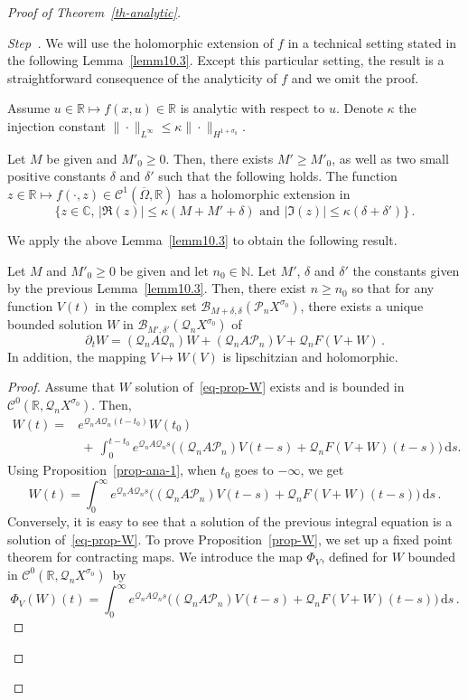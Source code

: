 \documentclass[AHL,Unicode,longabstracts]{cedram}
\newcommand{\RR}{\mathbb{R}}
\newcommand{\NN}{\mathbb{N}}
\newcommand{\CC}{\mathbb{C}}
\newcommand{\Cc}{\mathcal{C}}
\newcommand{\Bc}{\mathcal{B}}
\newcommand{\Pc}{\mathcal{P}}
\newcommand{\Qc}{\mathcal{Q}}
\newcommand{\drm}{\mathrm{d}}
\newcounter{stepcount}
\newenvironment{step}{\refstepcounter{stepcount}\begin{proof}[Step~\thestepcount]}{\let\qed\relax\end{proof}}
\begin{document}
\begin{proof}[{Proof of Theorem~\ref{th-analytic}}]
\begin{step}
We will use the holomorphic extension of $f$ in a technical setting stated in the following Lemma~\ref{lemm10.3}. Except this particular setting, the result is a straightforward consequence of the analyticity of $f$ and we omit the proof.
\begin{lemm}\label{lemm10.3}
Assume $u\in\RR \mapsto f(x,u)\in\RR$ is analytic with respect to $u$. Denote $\kappa$ the injection constant $\|\cdot\|_{L^\infty}\leq \kappa
\|\cdot\|_{H^{1+\sigma_0}}$.

Let $M$ be given and $M'_0\geq 0$. Then, there exists $M'\geq M'_0$, as well as two small positive constants $\delta$ and $\delta'$ such that the following holds. The function $z\in\RR \mapsto f(\cdot,z)\in \Cc^1(\overline\Omega,\RR)$ has a holomorphic extension in 
\[
\big\{z\in\CC,\,|\Re(z)|\leq \kappa(M+M'+\delta)\text{ and }|\Im(z)|\leq \kappa(\delta+\delta')\big\}\,.
\]
\end{lemm}

We apply the above Lemma~\ref{lemm10.3} to obtain the following result.

\begin{prop}\label{prop-W}
Let $M$ and $M'_0\geq 0$ be given and let $n_0\in\NN$. Let $M'$, $\delta$ and $\delta'$ the constants given by the previous Lemma~\ref{lemm10.3}. Then, there exist $n\geq n_0$ so that for any function $V(t)$ in the complex set $\Bc_{M+\delta,\delta}(\Pc_nX^{\sigma_0})$, there exists a unique bounded solution $W$ in $\Bc_{M',\delta'}(\Qc_nX^{\sigma_0})$ of
\begin{equation}\label{eq-prop-W}
\partial_t W = (\Qc_nA\Qc_n) W + (\Qc_nA\Pc_n) V+\Qc_n F(V+W)\,.
\end{equation}
In addition, the mapping $V\mapsto W(V)$ is lipschitzian and holomorphic.
\end{prop}
\begin{proof}
Assume that $W$ solution of~\eqref{eq-prop-W} exists and is bounded in $\Cc^0(\RR,\Qc_nX^{\sigma_0})$. Then,
\begin{align*}
W(t)=&e^{\Qc_n A\Qc_n (t-t_0)}W(t_0) \\
&\:+\,\int_{0}^{t-t_0} e^{\Qc_n A\Qc_n s}\big((\Qc_nA\Pc_n) V(t-s)+\Qc_n F(V+W)(t-s)\big)\,\drm s.
\end{align*}
Using Proposition~\ref{prop-ana-1}, when $t_0$ goes to $-\infty$, we get
\[
W(t)= \int_{0}^\infty e^{\Qc_n A\Qc_n s}\big((\Qc_nA\Pc_n)
V(t-s)+\Qc_n F(V+W)(t-s)\big)\,\drm s\,.
\]
Conversely, it is easy to see that a solution of the previous integral equation is a solution of~\eqref{eq-prop-W}. To prove Proposition~\ref{prop-W}, we set up a fixed point theorem for contracting maps. We introduce the map $\Phi_{V}$, defined for $W$ bounded in $\Cc^0(\RR,\Qc_nX^{\sigma_0})$~by
\[
\Phi_{V}(W)(t)=\int_0^\infty e^{\Qc_n A\Qc_n
s}\big((\Qc_nA\Pc_n)V(t-s)+\Qc_n F(V+W)(t-s)\big)\,\drm s\,.
\]


\end{proof}
\end{step}
\end{proof}
\end{document}
